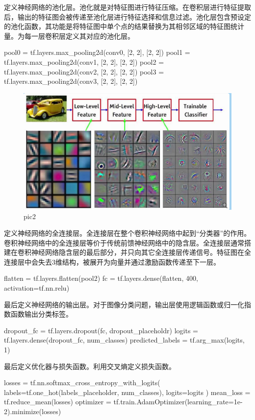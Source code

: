 \documentclass[12pt]{report}
\begin{document}
定义神经网络的池化层。池化就是对特征图进行特征压缩。在卷积层进行特征提取后，输出的特征图会被传递至池化层进行特征选择和信息过滤。池化层包含预设定的池化函数，其功能是将特征图中单个点的结果替换为其相邻区域的特征图统计量。为每一层卷积层定义其对应的池化层。
\begin{python}
pool0 = tf.layers.max_pooling2d(conv0, [2, 2], [2, 2])
pool1 = tf.layers.max_pooling2d(conv1, [2, 2], [2, 2])
pool2 = tf.layers.max_pooling2d(conv2, [2, 2], [2, 2])
pool3 = tf.layers.max_pooling2d(conv3, [2, 2], [2, 2])
\end{python}
\begin{figure}[h]
\centering
  \includegraphics[width=15cm]{5.png} %
  \caption{pic2} %
  \label{DirectedEdgeDetect} %
\end{figure}
定义神经网络的全连接层。全连接层在整个卷积神经网络中起到“分类器”的作用。卷积神经网络中的全连接层等价于传统前馈神经网络中的隐含层。全连接层通常搭建在卷积神经网络隐含层的最后部分，并只向其它全连接层传递信号。特征图在全连接层中会失去3维结构，被展开为向量并通过激励函数传递至下一层。
\begin{python}
flatten = tf.layers.flatten(pool2)
fc = tf.layers.dense(flatten, 400, activation=tf.nn.relu)
\end{python}

最后定义神经网络的输出层。对于图像分类问题，输出层使用逻辑函数或归一化指数函数输出分类标签。
\begin{python}
dropout_fc = tf.layers.dropout(fc, dropout_placeholdr)
logits = tf.layers.dense(dropout_fc, num_classes)
predicted_labels = tf.arg_max(logits, 1)
\end{python}

最后定义优化器与损失函数。利用交叉熵定义损失函数。
\begin{python}
losses = tf.nn.softmax_cross_entropy_with_logits(
    labels=tf.one_hot(labels_placeholder, num_classes),
    logits=logits
)
mean_loss = tf.reduce_mean(losses)
optimizer = tf.train.AdamOptimizer(learning_rate=1e-2).minimize(losses)
\end{python}
\end{document}

